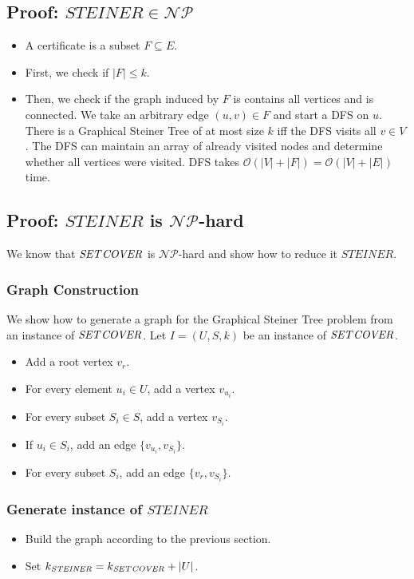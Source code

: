 \documentclass[12pt]{article}
\begin{document}
\subsection*{Proof: $\mathit{STEINER} \in \mathcal{NP}$}
\begin{itemize}
	\item A certificate is a subset $F \subseteq E$.
	\item First, we check if $|F| \leq k$.
	\item Then, we check if the graph induced by $F$ is contains all vertices and is connected. We take an arbitrary edge $(u,v) \in F$ and start a DFS on $u$. There is a Graphical Steiner Tree of at most size $k$ iff the DFS visits all $v \in V$. The DFS can maintain an array of already visited nodes and determine whether all vertices were visited. DFS takes $\mathcal{O}(|V| + |F|) = \mathcal{O}(|V| + |E|)$ time.
\end{itemize}

\subsection*{Proof: $\mathit{STEINER}$ is $\mathcal{NP}$-hard}
We know that $\mathit{SET\-COVER}$ is $\mathcal{NP}$-hard and show how to reduce it $\mathit{STEINER}$.

\subsubsection*{Graph Construction}
We show how to generate a graph for the Graphical Steiner Tree problem from an instance of $\mathit{SET\-COVER}$. Let $I = (U, S, k)$ be an instance of $\mathit{SET\-COVER}$.

\begin{itemize}
	\item Add a root vertex $v_r$.
	\item For every element $u_i \in U$, add a vertex $v_{u_i}$.
	\item For every subset $S_i \in S$, add a vertex $v_{S_i}$.
	\item If $u_i \in S_i$, add an edge $\{v_{u_i}, v_{S_i}\}$.
	\item For every subset $S_i$, add an edge $\{v_r, v_{S_i}\}$.
\end{itemize}

\subsubsection*{Generate instance of $\mathit{STEINER}$}
\begin{itemize}
	\item Build the graph according to the previous section.
	\item Set $k_\mathit{STEINER} = k_\mathit{SET\-COVER} + |U|$.
\end{itemize}
\end{document}
